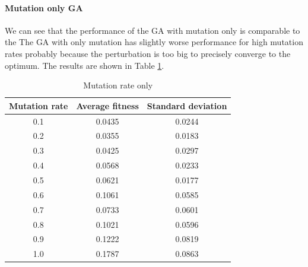 \paragraph*{Mutation only GA}
We can see that the performance of the GA with mutation only is comparable to the The GA with only mutation has slightly worse performance for high mutation rates probably because the perturbation is too big to precisely converge to the optimum. The results are shown in Table \ref{tab:mutation_rate}.
\begin{table}
    \centering
    \begin{tabular}{|c|c|c|}
        Mutation rate & Average fitness & Standard deviation \\ \hline
        0.1           & 0.0435          & 0.0244             \\
        0.2           & 0.0355          & 0.0183             \\
        0.3           & 0.0425          & 0.0297             \\
        0.4           & 0.0568          & 0.0233             \\
        0.5           & 0.0621          & 0.0177             \\
        0.6           & 0.1061          & 0.0585             \\
        0.7           & 0.0733          & 0.0601             \\
        0.8           & 0.1021          & 0.0596             \\
        0.9           & 0.1222          & 0.0819             \\
        1.0           & 0.1787          & 0.0863             \\
    \end{tabular}
    \caption{Mutation rate only}
    \label{tab:mutation_rate}
\end{table}

